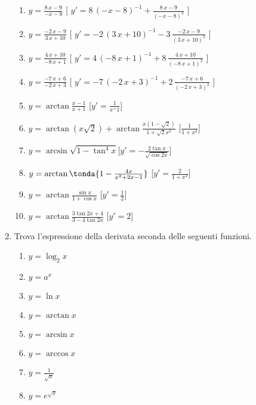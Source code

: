 \begin{enumerate}
\begin{enumerate}
\item \(y= {\frac {8\,x-9}{-x-8}} \) \hfill [ \(y'= 8\, \left( -x-8 \right) 
^{-1}+{\frac {8\,x-9}{ \left( -x-8 \right) ^{2}}}\) ]
\item \(y= {\frac {-2\,x-9}{3\,x+10}} \) \hfill [ \(y'= -2\, \left( 3\,x+10 \right) 
^{-1}-3\,{\frac {-2\,x-9}{ \left( 3\,x+10 \right) ^{2}}}\) ]
\item \(y= {\frac {4\,x+10}{-8\,x+1}} \) \hfill [ \(y'= 4\, \left( -8\,x+1 \right) 
^{-1}+8\,{\frac {4\,x+10}{ \left( -8\,x+1 \right) ^{2}}}\) ]
\item \(y= {\frac {-7\,x+6}{-2\,x+3}} \) \hfill [ \(y'= -7\, \left( -2\,x+3 \right) 
^{-1}+2\,{\frac {-7\,x+6}{ \left( -2\,x+3 \right) ^{2}}}\) ]
\item \(y=\arctan\frac{x-1}{x+1} \) \hfill [\(y'=\frac{1}{x^+1}\)]
\item \(y=\arctan(x\sqrt{2})+\arctan\frac{x(1-\sqrt{2})}{1+\sqrt{2}x^2}\)\hfill
[\(\frac{1}{1+x^2}\)]
\item \(y=\arcsin\sqrt{1-\tan^4 x} \)\hfill [\(y'=-\frac{2\tan x}{\sqrt{\cos 
2x}}\)]
\item \(y=\arctan\tonda{1-\frac{4x}{x^2+2x-1}}\) \hfill [\(y'=\frac{2}{1+x^2}\)]
\item \(y=\arctan\frac{\sin x}{1+\cos x}\) \hfill [\(y'=\frac{1}{2}\)]
\item \(y=\arctan\frac{3\tan 2x+4}{3-4\tan 2x}\) \hfill [\(y'=2\)]
\end{enumerate}

\item Trova l'espressione della derivata seconda delle seguenti funzioni.
\begin{multicols}{3}
\begin{enumerate}
\item \(y=\log_2 {x}\)
\item \(y= a^x\)
\item \(y= \ln x\)
\item \(y=\arctan x\)
\item\( y=\arcsin x\)
\item \(y=\arccos x\)
\item \(y= \frac{1}{\sqrt{x}}\)
\item \(y=e^{\sqrt{x}}\)
\end{enumerate}
\end{multicols}
\end{enumerate}
 
 
